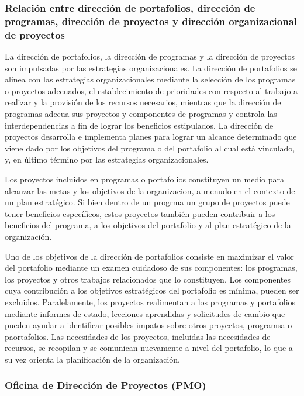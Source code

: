 \subsubsection{Relación entre dirección de portafolios, dirección de programas, dirección de proyectos y dirección organizacional de proyectos}

La dirección de portafolios, la dirección de programas y la dirección de proyectos son impulsadas por las estrategias organizacionales. La dirección de portafolios se alinea con las estrategias organizacionales mediante la selección de los programas o proyectos adecuados, el establecimiento de prioridades con respecto al trabajo a realizar y la provisión de los recursos necesarios, mientras que la dirección de programas adecua sus proyectos y componentes de programas y controla las interdependencias a fin de lograr los beneficios estipulados. La dirección de proyectos desarrolla e implementa planes para lograr un alcance determinado que viene dado por los objetivos del programa o del portafolio al cual está vinculado, y, en último término por las estrategias organizacionales.

Los proyectos incluidos en programas o portafolios constituyen un medio para alcanzar las metas y los objetivos de la organizacion, a menudo en el contexto de un plan estratégico. Si bien dentro de un progrma un grupo de proyectos puede tener beneficios específicos, estos proyectos también pueden contribuir a los beneficios del programa, a los objetivos del portafolio y al plan estratégico de la organización.

Uno de los objetivos de la dirección de portafolios consiste en maximizar el valor del portafolio mediante un examen cuidadoso de sus componentes: los programas, los proyectos y otros trabajos relacionados que lo constituyen. Los componentes cuya contribución a los objetivos estratégicos del portafolio es mínima, pueden ser excluidos. Paralelamente, los proyectos realimentan a los programas y portafolios mediante informes de estado, lecciones aprendidas y solicitudes de cambio que pueden ayudar a identificar posibles impatos sobre otros proyectos, programsa o paortafolios. Las necesidades de los proyectos, incluidas las necesidades de recursos, se recopilan y se comunican nuevamente a nivel del portafolio, lo que a su vez orienta la planificación de la organización.

\subsubsection{Oficina de Dirección de Proyectos (PMO)}

